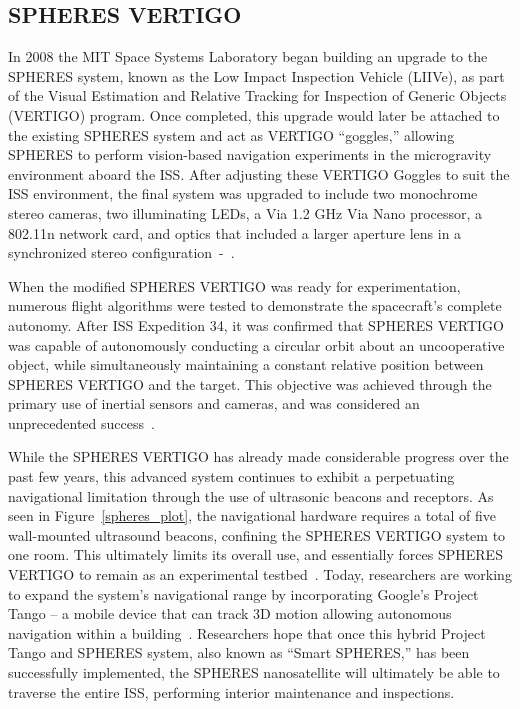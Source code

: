 \documentclass[journal, 10pt]{IEEEtran}
\begin{document}
\subsection{SPHERES VERTIGO}
In 2008 the MIT Space Systems Laboratory began building an upgrade to the SPHERES system, known as the Low Impact Inspection Vehicle (LIIVe), as part of the Visual Estimation and Relative Tracking for Inspection of Generic Objects (VERTIGO) program. Once completed, this upgrade would later be attached to the existing SPHERES system and act as VERTIGO ``goggles,'' allowing SPHERES to perform vision-based navigation experiments in the microgravity environment aboard the ISS. After adjusting these VERTIGO Goggles to suit the ISS environment, the final system was upgraded to include two monochrome stereo cameras, two illuminating LEDs, a Via 1.2 GHz Via Nano processor, a 802.11n network card, and optics that included a larger aperture lens in a synchronized stereo configuration~\cite{SPHERES}-~\cite{Vertigo3}.

When the modified SPHERES VERTIGO was ready for experimentation, numerous flight algorithms were tested to demonstrate the spacecraft's complete autonomy. After ISS Expedition 34, it was confirmed that SPHERES VERTIGO was capable of autonomously conducting a circular orbit about an uncooperative object, while simultaneously maintaining a constant relative position between SPHERES VERTIGO and the target. This objective was achieved through the primary use of inertial sensors and cameras, and was considered an unprecedented success~\cite{Vertigo2, Vertigo3}.

While the SPHERES VERTIGO has already made considerable progress over the past few years, this advanced system continues to exhibit a perpetuating navigational limitation through the use of ultrasonic beacons and receptors.  As seen in Figure~\ref{spheres_plot}, the navigational hardware requires a total of five wall-mounted ultrasound beacons, confining the SPHERES VERTIGO system to one room. This ultimately  limits its overall use, and essentially forces SPHERES VERTIGO to remain as an experimental testbed~\cite{SPHERES, Vertigo 1, Vertigo2, Vertigo3}. Today, researchers are working to expand the system's navigational range by incorporating Google's Project Tango -- a mobile device that can track 3D motion allowing autonomous navigation within a building~\cite{Tango}. Researchers hope that once this hybrid Project Tango and SPHERES system, also known as ``Smart SPHERES,'' has been successfully implemented, the SPHERES nanosatellite will ultimately be able to traverse the entire ISS, performing interior maintenance and inspections.
\end{document}
